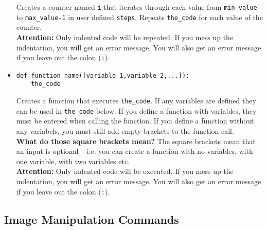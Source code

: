 \documentclass[11pt,a4paper]{report}
\begin{document}
\begin{itemize}
Creates a \gls{counter} named \texttt{i} that iterates through each value from \texttt{min\_value} to \texttt{max\_value-1} in user defined \texttt{steps}. Repeats \texttt{the\_code} for each value of the counter.\\
{\bf Attention:} Only indented code will be repeated. If you mess  up the indentation, you will get an error message.  You will also get an error message if you leave out the colon (\texttt{:}).

\item \begin{lstlisting}
def function_name([variable_1,variable_2,...]):
	the_code
\end{lstlisting}

Creates a \gls{function}  that executes \texttt{the\_code}. If any variables are defined they can be used in \texttt{the\_code} below. If you define a function with variables, they must be entered when  calling the  function. If you define a function without any variabels, you must still add empty brackets to  the function call.  \\
{\bf What do those square brackets mean?} The square brackets mean that an input  is optional -- i.e. you can create a function with no variables, with one variable, with  two variables etc.  \\
 {\bf Attention:} Only indented code will be executed. If you mess  up the indentation, you will get an error message. You will also get an error message if you leave out the colon (\texttt{:}).
 
 
 \end{itemize}
 
 \subsection{Image Manipulation Commands}
 
\end{document}
